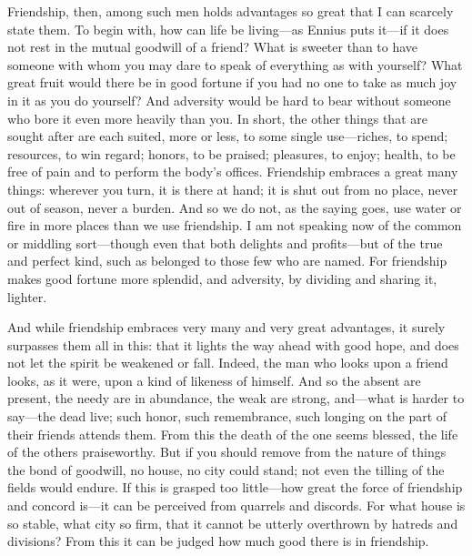  Friendship, then, among such men holds advantages so great that I can scarcely state them. To begin with, how can life be living—as Ennius puts it—if it does not rest in the mutual goodwill of a friend? What is sweeter than to have someone with whom you may dare to speak of everything as with yourself? What great fruit would there be in good fortune if you had no one to take as much joy in it as you do yourself? And adversity would be hard to bear without someone who bore it even more heavily than you. In short, the other things that are sought after are each suited, more or less, to some single use—riches, to spend; resources, to win regard; honors, to be praised; pleasures, to enjoy; health, to be free of pain and to perform the body's offices. Friendship embraces a great many things: wherever you turn, it is there at hand; it is shut out from no place, never out of season, never a burden. And so we do not, as the saying goes, use water or fire in more places than we use friendship. I am not speaking now of the common or middling sort—though even that both delights and profits—but of the true and perfect kind, such as belonged to those few who are named. For friendship makes good fortune more splendid, and adversity, by dividing and sharing it, lighter.

 And while friendship embraces very many and very great advantages, it surely surpasses them all in this: that it lights the way ahead with good hope, and does not let the spirit be weakened or fall. Indeed, the man who looks upon a friend looks, as it were, upon a kind of likeness of himself. And so the absent are present, the needy are in abundance, the weak are strong, and—what is harder to say—the dead live; such honor, such remembrance, such longing on the part of their friends attends them. From this the death of the one seems blessed, the life of the others praiseworthy. But if you should remove from the nature of things the bond of goodwill, no house, no city could stand; not even the tilling of the fields would endure. If this is grasped too little—how great the force of friendship and concord is—it can be perceived from quarrels and discords. For what house is so stable, what city so firm, that it cannot be utterly overthrown by hatreds and divisions? From this it can be judged how much good there is in friendship.

